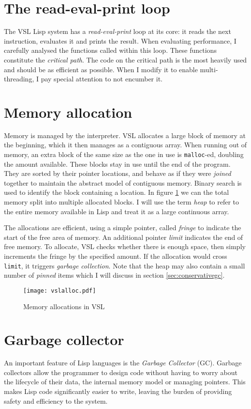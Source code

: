 \section{The read-eval-print loop}

The VSL Lisp system has a \emph{read-eval-print} loop at its core: it reads the next instruction, evaluates
it and prints the result. When evaluating performance, I carefully analysed the functions
called within this loop. These functions constitute the \emph{critical path}. The code on the critical
path is the most heavily used and should be as efficient as possible. When I modify it to enable
multi-threading, I pay special attention to not encumber it.

\section{Memory allocation}
Memory is managed by the interpreter. VSL allocates a large block of memory at the beginning,
which it then manages as a contiguous array. When running out of memory, an extra block of the
same size as the one in use is \verb|malloc|-ed, doubling the amount available. These blocks
stay in use until the end of the program. They are sorted by their pointer locations,
and behave as if they were \emph{joined} together to maintain the abstract model of contiguous memory.
Binary search is used to identify the block containing a location.
In figure \ref{fig:vslalloc} we can the total memory split into multiple allocated blocks.
I will use the term \emph{heap} to refer to the entire memory available in Lisp and treat it as
a large continuous array.

The allocations are efficient, using a simple pointer, called \emph{fringe} to indicate the start of the
free area of memory. An additional pointer \emph{limit} indicates the end of free memory. To allocate,
VSL checks whether there is enough space, then simply increments the fringe by the specified amount.
If the allocation would cross \verb|limit|, it triggers \emph{garbage collection}. Note that the heap
may also contain a small number of \emph{pinned} items which I will discuss in section \ref{sec:conservativegc}.

\begin{figure}[H]
    \centering
    \texttt{[image: vslalloc.pdf]}
    \caption{Memory allocations in VSL}
    \label{fig:vslalloc}
\end{figure}

\section{Garbage collector}
An important feature of Lisp languages is the \emph{Garbage Collector} (GC). Garbage collectors allow the programmer
to design code without having to worry about the lifecycle of their data, the internal memory model or
managing pointers. This makes Lisp code significantly easier to write, leaving the burden of providing safety and
efficiency to the system.

